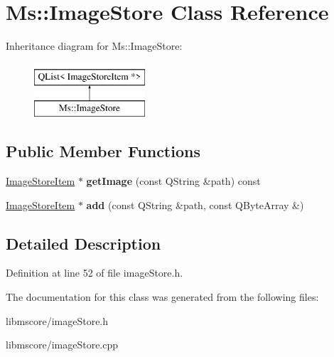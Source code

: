 \hypertarget{class_ms_1_1_image_store}{}\section{Ms\+:\+:Image\+Store Class Reference}
\label{class_ms_1_1_image_store}
Inheritance diagram for Ms\+:\+:Image\+Store\+:\begin{figure}[H]
\begin{center}
\leavevmode
\includegraphics[height=2.000000cm]{class_ms_1_1_image_store}
\end{center}
\end{figure}
\subsection*{Public Member Functions}
\begin{DoxyCompactItemize}
\item 
\mbox{\label{class_ms_1_1_image_store_ae4eb368554277dd3d5f1b33c21ac5860}} 
\hyperlink{class_ms_1_1_image_store_item}{Image\+Store\+Item} $\ast$ {\bfseries get\+Image} (const Q\+String \&path) const
\item 
\mbox{\label{class_ms_1_1_image_store_aa92975fd380b45a7510529f05d652e2b}} 
\hyperlink{class_ms_1_1_image_store_item}{Image\+Store\+Item} $\ast$ {\bfseries add} (const Q\+String \&path, const Q\+Byte\+Array \&)
\end{DoxyCompactItemize}


\subsection{Detailed Description}


Definition at line 52 of file image\+Store.\+h.



The documentation for this class was generated from the following files\+:\begin{DoxyCompactItemize}
\item 
libmscore/image\+Store.\+h\item 
libmscore/image\+Store.\+cpp\end{DoxyCompactItemize}
